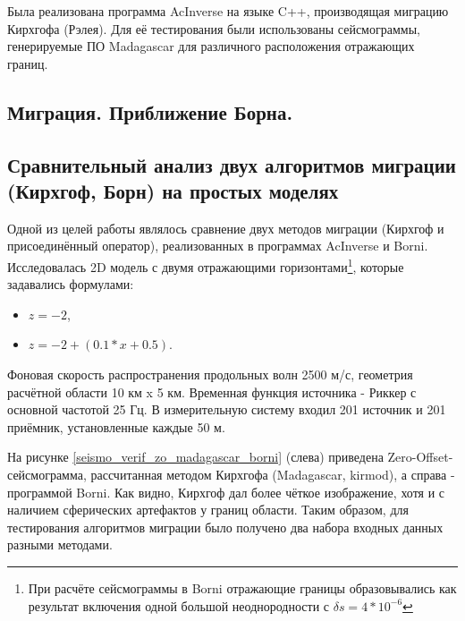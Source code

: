 \documentclass{article}
\begin{document}
Была реализована программа AcInverse на языке C++, производящая миграцию Кирхгофа (Рэлея).
Для её тестирования были использованы сейсмограммы, генерируемые ПО Madagascar для различного расположения отражающих границ.


\subsection{Миграция. Приближение Борна.}


\subsection{Сравнительный анализ двух алгоритмов миграции (Кирхгоф, Борн) на простых моделях}

Одной из целей работы являлось сравнение двух методов миграции (Кирхгоф и присоединённый оператор), реализованных в программах AcInverse и Borni.
Исследовалась 2D модель с двумя отражающими горизонтами\footnote{При расчёте сейсмограммы в Borni отражающие границы образовывались как результат включения одной большой неоднородности с $\delta s = 4*10^{-6}$}, которые задавались формулами:
\begin{itemize}
\item $z=-2$,
\item $z=-2 + (0.1 * x + 0.5)$.
\end{itemize}
Фоновая скорость распространения продольных волн 2500 м/с, геометрия расчётной области 10 км x 5 км.
Временная функция источника - Риккер с основной частотой 25 Гц.
В измерительную систему входил 201 источник и 201 приёмник, установленные каждые 50 м.

На рисунке \ref{seismo_verif_zo_madagascar_borni} (слева) приведена Zero-Offset-сейсмограмма, рассчитанная методом Кирхгофа (Madagascar, kirmod), а справа - программой Borni.
Как видно, Кирхгоф дал более чёткое изображение, хотя и с наличием сферических артефактов у границ области.
Таким образом, для тестирования алгоритмов миграции было получено два набора входных данных разными методами.

\noindent
\begin{minipage}{\linewidth}
\label{seismo_verif_zo_madagascar_borni}
\end{minipage}
\end{document}
